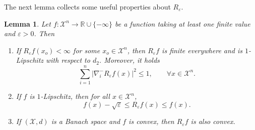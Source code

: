 \documentclass[11pt]{amsart}
\newtheorem{lem}[equation]{Lemma}
\numberwithin{equation}{section}
\begin{document}
The next lemma collects some useful properties about $R_\varepsilon$. 
 \begin{lem}\label{approx} Let $f:{\mathcal{X}}^n\to {\mathbb{R}}\cup\{-\infty\}$ be a function taking at least one finite value and $\varepsilon >0$. 
 Then 
 \begin{enumerate}[label={\bfseries (\roman*)}]
\item If $R_\varepsilon f(x_o)<\infty$ for some $x_o\in {\mathcal{X}}^n$, then $R_\varepsilon f$ is finite everywhere and is $1$-Lipschitz with respect to $d_2$. Moreover, it holds  
$$\displaystyle \sum_{i=1}^n|\nabla_i^- R_\varepsilon f(x)|^2\leq 1,\qquad \forall x\in {\mathcal{X}}^n.$$
\item If $f$ is $1$-Lipschitz, then for all $x\in {\mathcal{X}}^n$, 
$$f(x)-\sqrt \varepsilon\leq R_\varepsilon f(x)\leq f(x).$$
\item If $({\mathcal{X}},d)$ is a Banach space and $f$ is convex, then $R_\varepsilon f$ is also convex.
\end{enumerate}

\end{lem}
\end{document}
